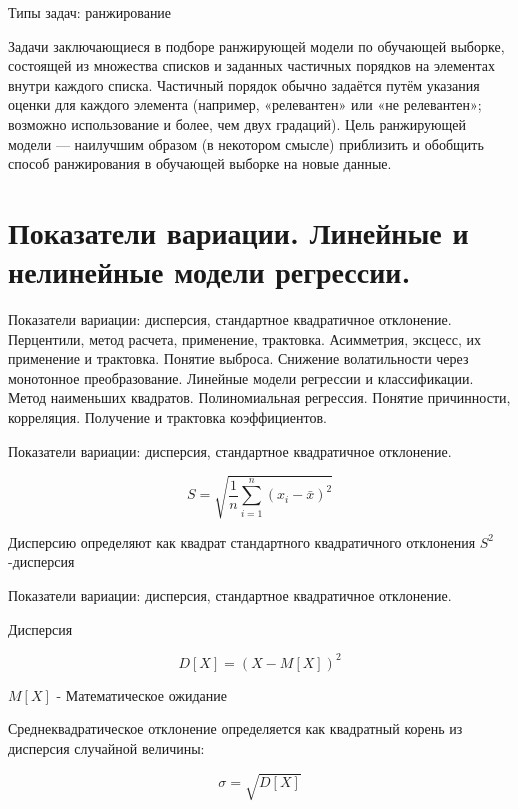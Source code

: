 \documentclass{beamer}
\begin{document}
\begin{frame}{Типы задач: ранжирование}

Задачи заключающиеся в подборе ранжирующей модели по обучающей выборке, 
состоящей из множества списков и заданных частичных порядков на элементах
 внутри каждого списка. Частичный порядок обычно задаётся путём указания оценки для каждого элемента 
 (например, «релевантен» или «не релевантен»; возможно использование и более, чем двух градаций). 
 Цель ранжирующей модели — наилучшим образом (в некотором смысле) приблизить и обобщить способ
  ранжирования в обучающей выборке на новые данные.

\end{frame}


\section{Показатели вариации. Линейные и нелинейные модели регрессии.}


\begin{frame}
Показатели вариации: дисперсия, стандартное квадратичное отклонение.
Перцентили, метод расчета, применение, трактовка.
Асимметрия, эксцесс, их применение и трактовка. Понятие выброса. 
Снижение волатильности через монотонное преобразование.
 Линейные модели регрессии и классификации.
  Метод наименьших квадратов. 
  Полиномиальная регрессия. 
  Понятие причинности, корреляция. 
  Получение и трактовка коэффициентов.
\end{frame}


\begin{frame}{Показатели вариации: дисперсия, стандартное квадратичное отклонение.}

$$S=\sqrt{\frac{1}{n}\sum_{i=1}^n\left(x_i-\bar{x}\right)^2}$$

Дисперсию определяют как квадрат стандартного квадратичного отклонения
 $S^2$ -дисперсия

\end{frame}


\begin{frame}{Показатели вариации: дисперсия, стандартное квадратичное отклонение.}


Дисперсия 

$$D[X] = (X -M[X])^2$$
 
 $M[X]$ - Математическое ожидание
 
 
 Среднеквадратическое отклонение определяется как квадратный корень из дисперсия случайной величины:
 
 $$\sigma = \sqrt{D[X]}$$

\end{frame}
\end{document}
